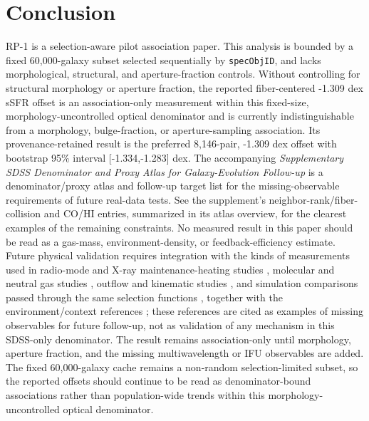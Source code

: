 \documentclass[twocolumn]{aastex631}
\begin{document}
\section{Conclusion}
RP-1 is a selection-aware pilot association paper. This analysis is bounded by a fixed 60,000-galaxy subset selected sequentially by \texttt{specObjID}, and lacks morphological, structural, and aperture-fraction controls. Without controlling for structural morphology or aperture fraction, the reported fiber-centered -1.309 dex sSFR offset is an association-only measurement within this fixed-size, morphology-uncontrolled optical denominator and is currently indistinguishable from a morphology, bulge-fraction, or aperture-sampling association. Its provenance-retained result is the preferred 8,146-pair, -1.309 dex offset with bootstrap 95\% interval [-1.334,-1.283] dex. The accompanying \emph{Supplementary SDSS Denominator and Proxy Atlas for Galaxy-Evolution Follow-up} is a denominator/proxy atlas and follow-up target list for the missing-observable requirements of future real-data tests. See the supplement's neighbor-rank/fiber-collision and CO/HI entries, summarized in its atlas overview, for the clearest examples of the remaining constraints. No measured result in this paper should be read as a gas-mass, environment-density, or feedback-efficiency estimate.
Future physical validation requires integration with the kinds of measurements used in radio-mode and X-ray maintenance-heating studies \citep{best2005,fabian2012,mcnamara2007,heckmanbest2014,lamassa2013}, molecular and neutral gas studies \citep{xcoldgass2017,xgass2018}, outflow and kinematic studies \citep{veilleux2005,cicone2014,carniani2017,fiore2017}, and simulation comparisons passed through the same selection functions \citep{simba2019,tng2019,eagle2015}, together with the environment/context references \citep{peng2010,ellison2011,piotrowska2022,wetzel2013,dekel2006}; these references are cited as examples of missing observables for future follow-up, not as validation of any mechanism in this SDSS-only denominator. The result remains association-only until morphology, aperture fraction, and the missing multiwavelength or IFU observables are added. The fixed 60,000-galaxy cache remains a non-random selection-limited subset, so the reported offsets should continue to be read as denominator-bound associations rather than population-wide trends within this morphology-uncontrolled optical denominator.
\end{document}
